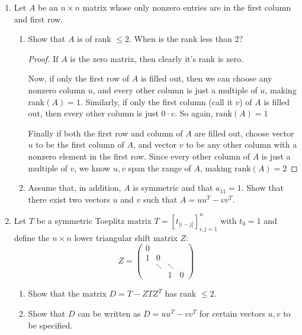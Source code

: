 \documentclass[11pt]{article}
\newcommand{\n}{\vspace{0.2cm}}
\begin{document}
\begin{enumerate}
	\item Let \(A\) be an \(n \times n\) matrix whose only nonzero entries are in the first column and first row.
	      \begin{enumerate}[label=(\alph*)]
		      \item Show that \(A\) is of rank \(\leq 2\).  When is the rank less than 2?
		            \begin{proof}
			            If \(A\) is the zero matrix, then clearly it's rank is zero. \n

			            Now, if only the first row of \(A\) is filled out, then we can choose any nonzero column \(u\), and every other column is just a multiple of \(u\), making \(\text{rank}(A) = 1\).  Similarly, if only the first column (call it \(v\)) of \(A\) is filled out, then every other column is just \(0 \cdot v\).  So again, \(\text{rank}(A) = 1\) \n

			            Finally if both the first row and column of \(A\) are filled out, choose vector \(u\) to be the first column of \(A\), and vector \(v\) to be any other column with a nonzero element in the first row.  Since every other column of \(A\) is just a multiple of \(v\), we know \(u,v\) span the range of \(A\), making \(\text{rank}(A) = 2\)\n
		            \end{proof}


		      \item Assume that, in addition, \(A\) is symmetric and that \(a_{11} = 1\).  Show that there exist two vectors \(u\) and \(v\) such that \(A = uu^T - vv^T\).
	      \end{enumerate}

	\item Let \(T\) be a symmetric Toeplitz matrix \(T = [t_{|i-j|}]^n_{i,j=1}\) with \(t_0 = 1\) and define the \(n \times n\) lower triangular shift matrix \(Z\):
	      \[Z = \begin{pmatrix} 0 & & & \\ 1 & 0 & & \\ & \ddots & \ddots & \\ & & 1 & 0 \end{pmatrix}\]
	      \begin{enumerate}[label=(\alph*)]
		      \item Show that the matrix \(D = T - ZTZ^T\) has rank \(\leq 2\).
		      \item Show that \(D\) can be written as \(D = uu^T - vv^T\) for certain vectors \(u,v\) to be specified.
	      \end{enumerate}


\end{enumerate}
\end{document}
